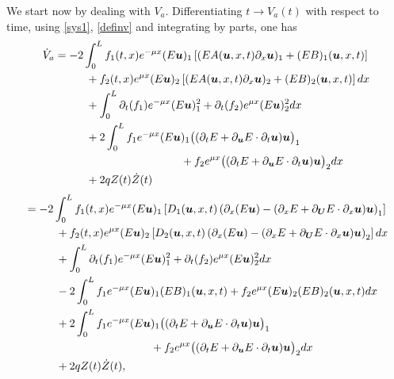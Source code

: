 \documentclass[JEP,XML,SOM,Unicode]{cedram}
\theoremstyle{definition}
\begin{document}
We start now by dealing with $V_{a}$. Differentiating $t\to V_{a}(t)$ with respect to time, using \eqref{sys1}, \eqref{definv} and integrating by parts, one has
\begin{align}
\label{diffVa0}
\dot V_{a}&= -2\int_{0}^{L}f_{1}(t,x)e^{-\mu x}(E\boldsymbol{u})_{1}\left[(EA(\boldsymbol{u},x,t)\partial_{x} \boldsymbol{u})_{1}+(EB)_{1}(\boldsymbol{u},x,t)\right]\\
&\hspace*{1cm}+f_{2}(t,x)e^{\mu x}(E\boldsymbol{u})_{2}\left[(EA(\boldsymbol{u},x,t)\partial_{x} \boldsymbol{u})_{2}+(EB)_{2}(\boldsymbol{u},x,t)\right]dx\notag\\
&\hspace*{1cm}+\int_{0}^{L}\partial_{t}(f_{1})e^{-\mu x}(E\boldsymbol{u})_{1}^{2}+\partial_{t}(f_{2})e^{\mu x}(E\boldsymbol{u})_{2}^{2}dx
\notag\\
&\hspace*{1cm}+2\int_{0}^{L}f_{1}e^{-\mu x}(E\boldsymbol{u})_{1}\bigl((\partial_{t}E+\partial_{\boldsymbol{u}}E\cdot\partial_{t}\boldsymbol{u})\boldsymbol{u}\bigr)_{1}\notag\\
&\hspace*{4cm}+f_{2}e^{\mu x}\bigl((\partial_{t}E+\partial_{\boldsymbol{u}}E\cdot\partial_{t}\boldsymbol{u})\boldsymbol{u}\bigr)_{2}dx\notag\\
&\hspace*{1cm}+2qZ(t)\dot Z(t)\notag
\end{align}
\begin{align*}
&=-2\int_{0}^{L}f_{1}(t,x)e^{-\mu x}(E\boldsymbol{u})_{1}\left[D_{1}(\boldsymbol{u},x,t)\left(\partial_{x} (E\boldsymbol{u})-(\partial_{x}E+\partial_{\boldsymbol{U}}E\cdot\partial_{x}\boldsymbol{u})\boldsymbol{u}\right)_{1}\right]\\
&\hspace*{1cm}+f_{2}(t,x)e^{\mu x}(E\boldsymbol{u})_{2}\left[D_{2}(\boldsymbol{u},x,t)\left(\partial_{x} (E\boldsymbol{u})-(\partial_{x}E+\partial_{\boldsymbol{U}}E\cdot\partial_{x}\boldsymbol{u})\boldsymbol{u}\right)_{2}\right]dx\\
&\hspace*{1cm}+\int_{0}^{L}\partial_{t}(f_{1})e^{-\mu x}(E\boldsymbol{u})_{1}^{2}+\partial_{t}(f_{2})e^{\mu x}(E\boldsymbol{u})_{2}^{2}dx\\
&\hspace*{1cm}-2\int_{0}^{L}f_{1}e^{-\mu x}(E\boldsymbol{u})_{1}(EB)_{1}(\boldsymbol{u},x,t)+f_{2}e^{\mu x}(E\boldsymbol{u})_{2}(EB)_{2}(\boldsymbol{u},x,t)dx\\
&\hspace*{1cm}+2\int_{0}^{L}f_{1}e^{-\mu x}(E\boldsymbol{u})_{1}\bigl((\partial_{t}E+\partial_{\boldsymbol{u}}E\cdot\partial_{t}\boldsymbol{u})\boldsymbol{u}\bigl)_{1}\\
&\hspace*{4cm}+f_{2}e^{\mu x}\bigl((\partial_{t}E+\partial_{\boldsymbol{u}}E\cdot\partial_{t}\boldsymbol{u})\boldsymbol{u}\bigl)_{2}dx\\
&\hspace*{1cm}+2qZ(t)\dot Z(t),
\end{align*}
\end{document}
